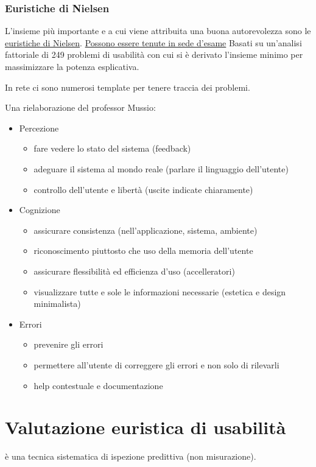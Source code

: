 \documentclass[11pt,a4paper]{book}
\begin{document}
\subsubsection{Euristiche di Nielsen}
L'insieme più importante e a cui viene attribuita una buona autorevolezza sono le \href{https://www.neurowebdesign.it/it/alla-scoperta-delle-10-euristiche-di-nielsen/}{euristiche di Nielsen}. \underline{Possono essere tenute in sede d'esame}
Basati su un'analisi fattoriale di 249 problemi di usabilità con cui si è derivato l'insieme minimo per massimizzare la potenza esplicativa.

In rete ci sono numerosi template per tenere traccia dei problemi.

Una rielaborazione del professor Mussio:
\begin{itemize}
	\item[] Percezione
	\begin{itemize}
		\item fare vedere lo stato del sistema (feedback)
		\item adeguare il sistema al mondo reale (parlare il linguaggio dell'utente)
		\item controllo dell'utente e libertà (uscite indicate chiaramente)
	\end{itemize}
	\item[] Cognizione
	\begin{itemize}
		\item assicurare consistenza (nell'applicazione, sistema, ambiente)
		\item riconoscimento piuttosto che uso della memoria dell'utente
		\item assicurare flessibilità ed efficienza d'uso (accelleratori)
		\item visualizzare tutte e sole le informazioni necessarie (estetica e design minimalista)
	\end{itemize}
	\item[] Errori
	\begin{itemize}
		\item prevenire gli errori
		\item permettere all'utente di correggere gli errori e non solo di rilevarli
		\item help contestuale e documentazione
	\end{itemize}
\end{itemize}


\section{Valutazione euristica di usabilità}
è una tecnica sistematica di ispezione predittiva (non misurazione).
\end{document}
